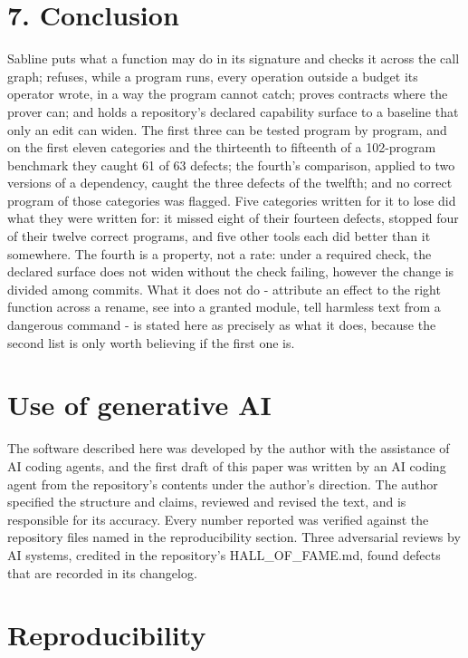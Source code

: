 \documentclass[
]{article}
\begin{document}
\section{7. Conclusion}\label{conclusion}

Sabline puts what a function may do in its signature and checks it
across the call graph; refuses, while a program runs, every operation
outside a budget its operator wrote, in a way the program cannot catch;
proves contracts where the prover can; and holds a repository's declared
capability surface to a baseline that only an edit can widen. The first
three can be tested program by program, and on the first eleven
categories and the thirteenth to fifteenth of a 102-program benchmark
they caught 61 of 63 defects; the fourth's comparison, applied to two
versions of a dependency, caught the three defects of the twelfth; and
no correct program of those categories was flagged. Five categories
written for it to lose did what they were written for: it missed eight
of their fourteen defects, stopped four of their twelve correct
programs, and five other tools each did better than it somewhere. The
fourth is a property, not a rate: under a required check, the declared
surface does not widen without the check failing, however the change is
divided among commits. What it does not do - attribute an effect to the
right function across a rename, see into a granted module, tell harmless
text from a dangerous command - is stated here as precisely as what it
does, because the second list is only worth believing if the first one
is.

\section{Use of generative AI}\label{use-of-generative-ai}

The software described here was developed by the author with the
assistance of AI coding agents, and the first draft of this paper was
written by an AI coding agent from the repository's contents under the
author's direction. The author specified the structure and claims,
reviewed and revised the text, and is responsible for its accuracy.
Every number reported was verified against the repository files named in
the reproducibility section. Three adversarial reviews by AI systems,
credited in the repository's HALL\_OF\_FAME.md, found defects that are
recorded in its changelog.

\section{Reproducibility}\label{reproducibility}
\end{document}
